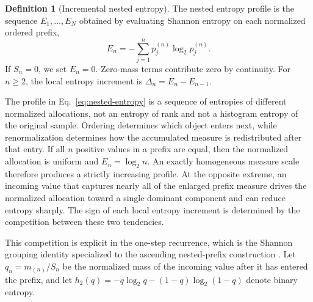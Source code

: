 \documentclass[aip,cha,reprint,superscriptaddress,floatfix]{revtex4-2}
\theoremstyle{definition}
\newtheorem{definition}[theorem]{Definition}
\theoremstyle{remark}
\begin{document}
\begin{definition}[Incremental nested entropy]
\label{def:nested}
The nested entropy profile is the sequence \(E_1,\ldots,E_N\) obtained by evaluating Shannon entropy on each normalized ordered prefix,
\begin{equation}
E_n=-\sum_{j=1}^{n}p_j^{(n)}\log_2 p_j^{(n)}.
\label{eq:nested-entropy}
\end{equation}
If \(S_n=0\), we set \(E_n=0\). Zero-mass terms contribute zero by continuity. For \(n\ge2\), the local entropy increment is \(\Delta_n=E_n-E_{n-1}\).
\end{definition}

The profile in Eq.~\eqref{eq:nested-entropy} is a sequence of entropies of different normalized allocations, not an entropy of rank and not a histogram entropy of the original sample. Ordering determines which object enters next, while renormalization determines how the accumulated measure is redistributed after that entry. If all \(n\) positive values in a prefix are equal, then the normalized allocation is uniform and \(E_n=\log_2 n\). An exactly homogeneous measure scale therefore produces a strictly increasing profile. At the opposite extreme, an incoming value that captures nearly all of the enlarged prefix measure drives the normalized allocation toward a single dominant component and can reduce entropy sharply. The sign of each local entropy increment is determined by the competition between these two tendencies.

This competition is explicit in the one-step recurrence, which is the Shannon grouping identity specialized to the ascending nested-prefix construction \cite{shannon1948,coverthomas2006}. Let \(q_n=m_{(n)}/S_n\) be the normalized mass of the incoming value after it has entered the prefix, and let \(h_2(q)=-q\log_2q-(1-q)\log_2(1-q)\) denote binary entropy.
\end{document}
